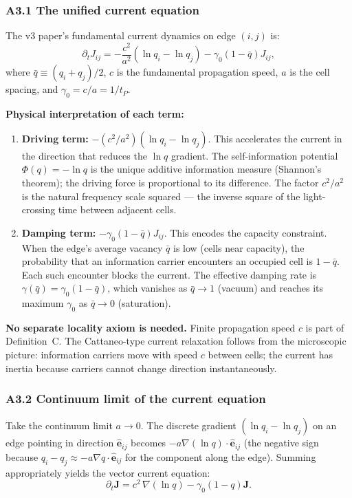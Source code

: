 \documentclass[reprint]{revtex4-2}
\begin{document}
\subsubsection{A3.1 The unified current equation}

The v3 paper's fundamental current dynamics on edge $(i,j)$ is:
\begin{equation}
\partial_t J_{ij} = -\frac{c^2}{a^2}(\ln q_i - \ln q_j) - \gamma_0(1-\bar{q})J_{ij},
\label{eq:a3_current}
\end{equation}
where $\bar{q} \equiv (q_i+q_j)/2$, $c$ is the fundamental propagation speed, $a$ is the cell spacing, and $\gamma_0 = c/a = 1/t_P$.

\textbf{Physical interpretation of each term:}
\begin{enumerate}[label=(\roman*)]
\item \textbf{Driving term:} $-(c^2/a^2)(\ln q_i - \ln q_j)$. This accelerates the current in the direction that reduces the $\ln q$ gradient. The self-information potential $\Phi(q)=-\ln q$ is the unique additive information measure (Shannon's theorem); the driving force is proportional to its difference. The factor $c^2/a^2$ is the natural frequency scale squared --- the inverse square of the light-crossing time between adjacent cells.
\item \textbf{Damping term:} $-\gamma_0(1-\bar{q})J_{ij}$. This encodes the capacity constraint. When the edge's average vacancy $\bar{q}$ is low (cells near capacity), the probability that an information carrier encounters an occupied cell is $1-\bar{q}$. Each such encounter blocks the current. The effective damping rate is $\gamma(\bar{q}) = \gamma_0(1-\bar{q})$, which vanishes as $\bar{q}\to 1$ (vacuum) and reaches its maximum $\gamma_0$ as $\bar{q}\to 0$ (saturation).
\end{enumerate}

\textbf{No separate locality axiom is needed.} Finite propagation speed $c$ is part of Definition~C. The Cattaneo-type current relaxation follows from the microscopic picture: information carriers move with speed $c$ between cells; the current has inertia because carriers cannot change direction instantaneously.

\subsubsection{A3.2 Continuum limit of the current equation}

Take the continuum limit $a\to 0$. The discrete gradient $(\ln q_i - \ln q_j)$ on an edge pointing in direction $\hat{\mathbf{e}}_{ij}$ becomes $-a\nabla(\ln q)\cdot\hat{\mathbf{e}}_{ij}$ (the negative sign because $q_i - q_j \approx -a\nabla q\cdot\hat{\mathbf{e}}_{ij}$ for the component along the edge). Summing appropriately yields the vector current equation:
\begin{equation}
\partial_t \mathbf{J} = c^2\,\nabla(\ln q) - \gamma_0(1-q)\mathbf{J}.
\label{eq:a3_continuum_current}
\end{equation}
\end{document}
